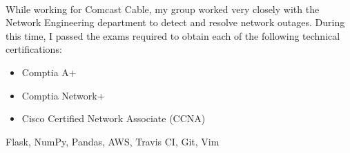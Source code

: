 \documentclass[letterpaper,11pt]{article}
\begin{document}
\begin{itemize}
    \\
        While working for Comcast Cable, my group worked very closely with the Network Engineering department to detect and resolve network outages. During this time, I passed the exams required to obtain each of the following technical certifications:
        \begin{itemize}
            \item Comptia A+
            \item Comptia Network+
            \item Cisco Certified Network Associate (CCNA)
        \end{itemize}

     Flask, NumPy, Pandas, AWS, Travis CI, Git, Vim
\end{itemize}
\end{document}

